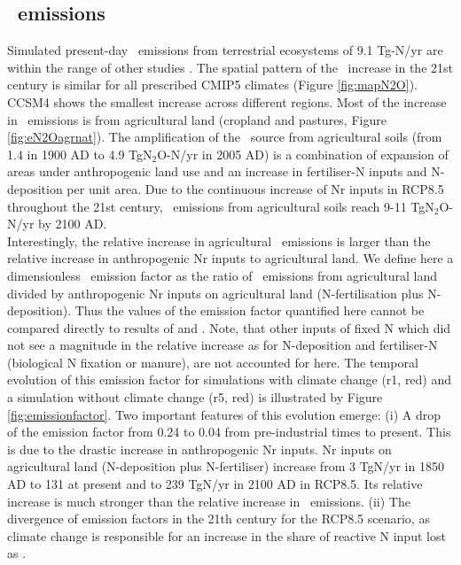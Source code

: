 \subsection{\nno\ emissions}
\label{sec:eN2O}
Simulated present-day \nno\ emissions from terrestrial ecosystems of 9.1 Tg\nno -N/yr are within the range of other studies \citep{denman07ipcc, hirsch06gbc, sykalia11ggmm, zaehle11ngeo, xuri12nphyt}. The spatial pattern of the \nno\ increase in the 21st century is similar for all prescribed CMIP5 climates (Figure \ref{fig:mapN2O}). CCSM4 shows the smallest increase across different regions. Most of the increase in \nno\ emissions is from agricultural land (cropland and pastures, Figure \ref{fig:eN2Oagrnat}). The amplification of the \nno\ source from agricultural soils (from 1.4 in 1900 AD to 4.9 TgN$_2$O-N/yr in 2005 AD) is a combination of expansion of areas under anthropogenic land use and an increase in fertiliser-N inputs and N-deposition per unit area. Due to the continuous increase of Nr inputs in RCP8.5 throughout the 21st century, \nno\ emissions from agricultural soils reach 9-11 TgN$_2$O-N/yr by 2100 AD.\\

Interestingly, the relative increase in agricultural \nno\ emissions is larger than the relative increase in anthropogenic Nr inputs to agricultural land. We define here a dimensionless \nno\ emission factor as the ratio of \nno\ emissions from agricultural land divided by anthropogenic Nr inputs on agricultural land (N-fertilisation plus N-deposition). Thus the values of the emission factor quantified here cannot be compared directly to results of \citet{davidson09natgeo} and \citet{crutzen08atmchemphys}. Note, that other inputs of fixed N which did not see a magnitude in the relative increase as for N-deposition and fertiliser-N (biological N fixation or manure), are not accounted for here. The temporal evolution of this emission factor for simulations with climate change (r1, red) and a simulation without climate change (r5, red) is illustrated by Figure \ref{fig:emissionfactor}. Two important features of this evolution emerge: (i) A drop of the emission factor from 0.24 to 0.04 from pre-industrial times to present. This is due to the drastic increase in anthropogenic Nr inputs. Nr inputs on agricultural land (N-deposition plus N-fertiliser) increase from 3 TgN/yr in 1850 AD to 131 at present and to 239 TgN/yr in 2100 AD in RCP8.5. Its relative increase is much stronger than the relative increase in \nno\ emissions. (ii) The divergence of emission factors in the 21th century for the RCP8.5 scenario, as climate change is responsible for an increase in the share of reactive N input lost as \nno .

